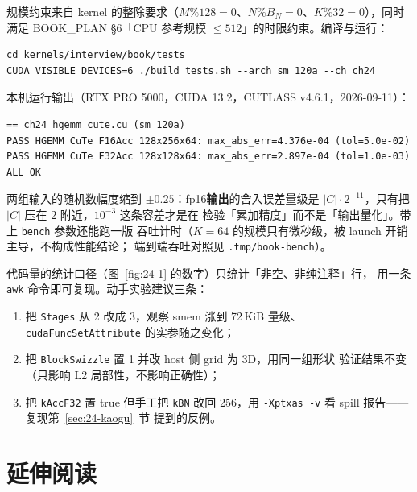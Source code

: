 规模约束来自 kernel 的整除要求（$M\%128=0$、$N\%B_N=0$、$K\%32=0$），同时满足
BOOK\_PLAN §6「CPU 参考规模 $\le 512$」的时限约束。编译与运行：

\begin{lstlisting}[style=console]
cd kernels/interview/book/tests
CUDA_VISIBLE_DEVICES=6 ./build_tests.sh --arch sm_120a --ch ch24
\end{lstlisting}

本机运行输出（RTX PRO 5000，CUDA 13.2，CUTLASS v4.6.1，2026-09-11）：

\begin{lstlisting}[style=console]
== ch24_hgemm_cute.cu (sm_120a)
PASS HGEMM CuTe F16Acc 128x256x64: max_abs_err=4.376e-04 (tol=5.0e-02)
PASS HGEMM CuTe F32Acc 128x128x64: max_abs_err=2.897e-04 (tol=1.0e-03)
ALL OK
\end{lstlisting}

两组输入的随机数幅度缩到 $\pm0.25$：fp16\textbf{输出}的舍入误差量级是
$|C|\cdot2^{-11}$，只有把 $|C|$ 压在 $2$ 附近，$10^{-3}$ 这条容差才是在
检验「累加精度」而不是「输出量化」。带上 \texttt{bench} 参数还能跑一版
吞吐计时（$K{=}64$ 的规模只有微秒级，被 launch 开销主导，不构成性能结论；
端到端吞吐对照见 \texttt{.\allowbreak{}tmp/\allowbreak{}book-bench}）。

代码量的统计口径（图~\ref{fig:24-1} 的数字）只统计「非空、非纯注释」行，
用一条 \texttt{awk} 命令即可复现。动手实验建议三条：

\begin{enumerate}
  \item 把 \texttt{Stages} 从 2 改成 3，观察 smem 涨到 72\,KiB 量级、
        \texttt{cuda\allowbreak{}Func\allowbreak{}Set\allowbreak{}Attribute} 的实参随之变化；
  \item 把 \texttt{Block\allowbreak{}Swizzle} 置 1 并改 host 侧 grid 为 3D，用同一组形状
        验证结果不变（只影响 L2 局部性，不影响正确性）；
  \item 把 \texttt{kAccF32} 置 true 但手工把 \texttt{kBN} 改回 256，用
        \texttt{-Xptxas -v} 看 spill 报告——复现第~\ref{sec:24-kaogu}~节
        提到的反例。
\end{enumerate}

\section*{延伸阅读}

